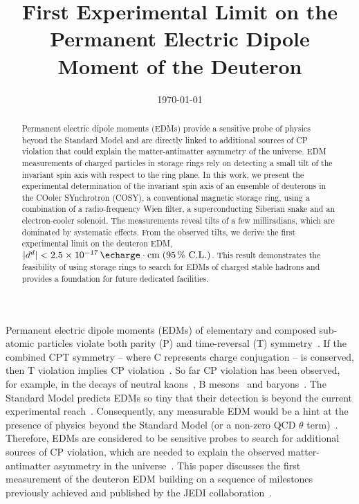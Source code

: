 \documentclass[
    10pt,
    twocolumn,
    secnumarabic,
    amssymb,
    nobibnotes,
    aps,
    prl,

    longbibliography,
    superscriptaddress
    ]{revtex4-2}
\date{\today}
\begin{document}
\title{First Experimental Limit on the Permanent Electric Dipole Moment of the Deuteron}



\noaffiliation

\begin{abstract}
    Permanent electric dipole moments (EDMs) provide a sensitive probe of physics beyond the Standard Model and are directly linked to additional sources of CP violation that could explain the matter-antimatter asymmetry of the universe. EDM measurements of charged particles in storage rings rely on detecting a small tilt of the invariant spin axis with respect to the ring plane. In this work, we present the experimental determination of the invariant spin axis of an ensemble of deuterons in the COoler SYnchrotron (COSY), a conventional magnetic storage ring, using a combination of a radio-frequency Wien filter, a superconducting Siberian snake and an electron-cooler solenoid. The measurements reveal tilts of a few milliradians, which are dominated by systematic effects. From the observed tilts, we derive the first experimental limit on the deuteron EDM, $|d^d|<\SI{2.5e-17}{\echarge\cdot cm} \; (\SI{95}{\%} \text{ C.L.})$. This result demonstrates the feasibility of using storage rings to search for EDMs of charged stable hadrons and provides a foundation for future dedicated facilities.
\end{abstract}

\maketitle

Permanent electric dipole moments (EDMs) of elementary and composed sub-atomic particles violate both parity (P) and time-reversal (T) symmetry~\cite{Khriplovich:1997ga,Pospelov:2005pr}.
If the combined CPT symmetry -- where C represents charge conjugation -- is conserved, then T violation implies CP violation~\cite{Luders:1957zz,Greenberg:2002uu}.
So far CP violation has been observed, for example, in the decays of neutral kaons~\cite{PhysRevLett.13.138}, B mesons~\cite{Gershon_2017,Aubert:2001nu} and baryons~\cite{LHCb:2025ray}.
The Standard Model predicts EDMs so tiny that their detection is beyond the current experimental reach~\cite{Engel:2013lsa,chupp:2017rkp}.
Consequently, any measurable EDM would be a hint at the presence of physics beyond the Standard Model (or a non-zero QCD $\theta$ term)~\cite{Pospelov:2005pr}.
Therefore, EDMs are considered to be sensitive probes to search for additional sources of CP violation, which are needed to explain the observed matter-antimatter asymmetry in the universe~\cite{Sakharov:1967dj}.
This paper discusses the first measurement of the deuteron EDM building on a sequence of milestones previously achieved and published by the JEDI collaboration~\cite{Guidoboni:2016bdn,Eversmann:2015jnk,PhysRevAccelBeams.20.072801,PhysRevResearch.7.023257,PhysRevAccelBeams.28.062801}.
\end{document}
